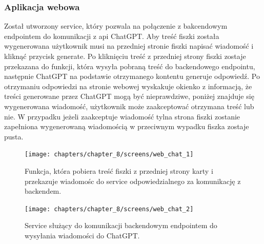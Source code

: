 \subsubsection{Aplikacja webowa}
Został utworzony service, który pozwala na połączenie z bakcendowym endpointem do komunikacji z api ChatGPT. Aby treść fiszki została wygenerowana użytkownik musi na przedniej stronie fiszki napisać wiadomość i kliknąć przycisk generate. Po kliknięciu treść z przedniej strony fiszki zostaje przekazana do funkcji, która wysyła pobraną treść do backendowego endpointu, następnie ChatGPT na podstawie otrzymanego kontentu generuje odpowiedź. Po otrzymaniu odpowiedzi na stronie webowej wyskakuje okienko z informacją, że treści generowane przez ChatGPT mogą być nieprawdziwe, poniżej znajduje się wygenerowana wiadomość, użytkownik może zaakceptować otrzymana treść lub nie. W przypadku jeżeli zaakceptuje wiadomość tylna strona fiszki zostanie zapełniona wygenerowaną wiadomością w przeciwnym wypadku fiszka zostaje pusta.

\begin{figure}[H]
    \centering
    \texttt{[image: chapters/chapter\_8/screens/web\_chat\_1]}
    \caption{Funkcja, która pobiera treść fiszki z przedniej strony karty i przekazuje wiadomośc do service odpowiedzialnego za komunikację z backendem.}
    \label{img:web_chat_1}
\end{figure}

\begin{figure}[H]
    \centering
    \texttt{[image: chapters/chapter\_8/screens/web\_chat\_2]}
    \caption{Service służący do komunikacji backendowym endpointem do wysyłania wiadomości do ChatGPT.}
    \label{img:web_chat_2}
\end{figure}